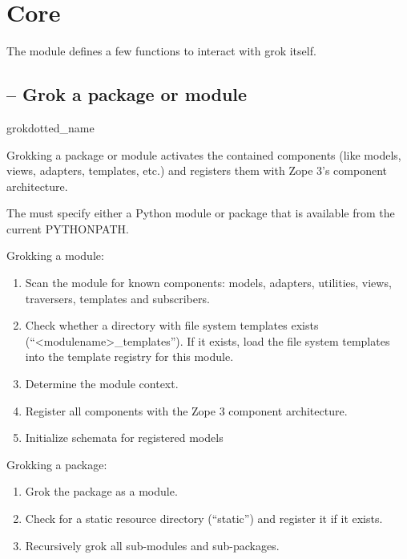 \chapter{Core}

The  module defines a few functions to interact with grok itself.


\section{ -- Grok a package or module}

    \begin{funcdesc}{grok}{dotted_name}

    Grokking a package or module activates the contained components (like
    models, views, adapters, templates, etc.) and registers them with Zope 3's
    component architecture.

    The  must specify either a Python module or package
    that is available from the current PYTHONPATH.

    Grokking a module:

    \begin{enumerate}

        \item Scan the module for known components: models, adapters,
              utilities, views, traversers, templates and subscribers.

        \item Check whether a directory with file system templates exists
        (``<modulename>_templates''). If it exists, load the file system
        templates into the template registry for this module.

        \item Determine the module context. 

        \item Register all components with the Zope 3 component architecture.

        \item Initialize schemata for registered models

    \end{enumerate}

    Grokking a package:

    \begin{enumerate}
        \item Grok the package as a module.

        \item Check for a static resource directory (``static'') and register
              it if it exists.

        \item Recursively grok all sub-modules and sub-packages.

    \end{enumerate}

    \end{funcdesc}

